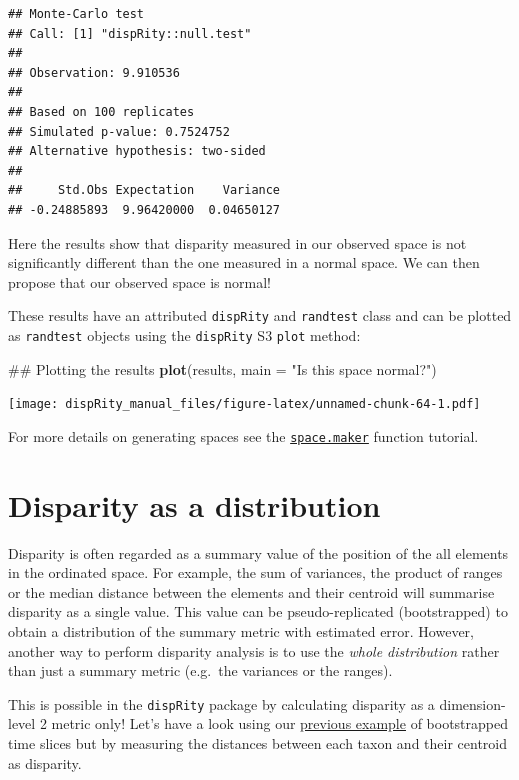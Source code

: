 \documentclass[]{book}
\newenvironment{Shaded}{\begin{snugshade}}{\end{snugshade}}
\newcommand{\KeywordTok}[1]{\textcolor[rgb]{0.13,0.29,0.53}{\textbf{#1}}}
\newcommand{\DataTypeTok}[1]{\textcolor[rgb]{0.13,0.29,0.53}{#1}}
\newcommand{\StringTok}[1]{\textcolor[rgb]{0.31,0.60,0.02}{#1}}
\newcommand{\NormalTok}[1]{#1}
\theoremstyle{definition}
\theoremstyle{definition}
\theoremstyle{remark}
\begin{document}
\begin{verbatim}
## Monte-Carlo test
## Call: [1] "dispRity::null.test"
## 
## Observation: 9.910536 
## 
## Based on 100 replicates
## Simulated p-value: 0.7524752 
## Alternative hypothesis: two-sided 
## 
##     Std.Obs Expectation    Variance 
## -0.24885893  9.96420000  0.04650127
\end{verbatim}

Here the results show that disparity measured in our observed space is
not significantly different than the one measured in a normal space. We
can then propose that our observed space is normal!

These results have an attributed \texttt{dispRity} and \texttt{randtest}
class and can be plotted as \texttt{randtest} objects using the
\texttt{dispRity} S3 \texttt{plot} method:

\begin{Shaded}
\begin{Highlighting}[]
\NormalTok{## Plotting the results}
\KeywordTok{plot}\NormalTok{(results, }\DataTypeTok{main =} \StringTok{"Is this space normal?"}\NormalTok{)}
\end{Highlighting}
\end{Shaded}

\texttt{[image: dispRity\_manual\_files/figure-latex/unnamed-chunk-64-1.pdf]}

For more details on generating spaces see the
\protect\hyperlink{Simulating-multidimensional-spaces}{\texttt{space.maker}}
function tutorial.

\hypertarget{disparity-as-a-distribution}{\section{Disparity as a
distribution}\label{disparity-as-a-distribution}}

Disparity is often regarded as a summary value of the position of the
all elements in the ordinated space. For example, the sum of variances,
the product of ranges or the median distance between the elements and
their centroid will summarise disparity as a single value. This value
can be pseudo-replicated (bootstrapped) to obtain a distribution of the
summary metric with estimated error. However, another way to perform
disparity analysis is to use the \emph{whole distribution} rather than
just a summary metric (e.g.~the variances or the ranges).

This is possible in the \texttt{dispRity} package by calculating
disparity as a dimension-level 2 metric only! Let's have a look using
our \protect\hyperlink{summarising-dispRity-data-plots}{previous
example} of bootstrapped time slices but by measuring the distances
between each taxon and their centroid as disparity.
\end{document}
